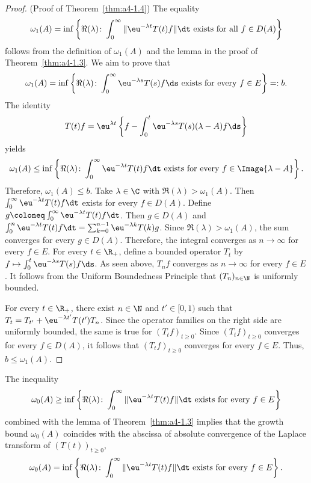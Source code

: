 \begin{proof}(Proof of Theorem~\ref{thm:a4-1.4}) 
The equality 
 \[ 
 \omega_1(A) = \inf \left\{ \Re(\lambda)\colon\int_0^\infty \|\eu^{-\lambda t} T(t) f \|  \dt \text{ exists for all } f \in D(A) \right\} 
 \] 
 follows from the definition of\/ $\omega_1(A)$ and the lemma in the proof of Theorem~\ref{thm:a4-1.3}.
We aim to prove that
\[
\omega_1(A) = \inf \left\{ \Re(\lambda)\colon\int_0^\infty \eu^{-\lambda s} T(s) f  \ds \text{ exists for every } f \in E \right\}=: b. 
\]
The identity
\[
    T(t) f = \eu^{\lambda t} \left\{ f - \int_0^{t} \eu^{-\lambda s} T(s) (\lambda - A) f  \ds \right\}
\]
yields
\[
\omega_1(A) \leq \inf \left\{ \Re(\lambda)\colon\int_0^\infty \eu^{-\lambda t} T(t) f  \dt \text{ exists for every } f \in \Image{\lambda - A} \right\}.
\]
Therefore, $\omega_1(A) \leq b$.
Take $\lambda \in \C$ with $\Re(\lambda) > \omega_1(A)$. 
Then $\int_0^\infty \eu^{-\lambda t} T(t) f  \dt$ exists for every $f \in D(A)$. 
Define $g \coloneq  \int_0^\infty \eu^{-\lambda t} T(t) f  \dt$. 
Then $g \in D(A)$ and $\int_0^n \eu^{-\lambda t} T(t) f  \dt = \sum_{k=0}^{n-1} \eu^{-\lambda k} T(k) g$. 
Since $\Re(\lambda) > \omega_1(A)$, the sum converges for every $g \in D(A)$. 
Therefore, the integral converges as $n \to \infty$ for every $f \in E$.
For every $t \in \R_+$, define a bounded operator $T_t$ by $ f \mapsto \int_0^t \eu^{-\lambda s} T(s) f  \ds$. 
As seen above, $T_n f$ converges as $n \to \infty$ for every $f \in E$. 
It follows from the Uniform Boundedness Principle that $(T_n)_{n \in \N}$ is uniformly bounded.
%


For every $t \in \R_+$, there exist $n \in \N$ and $t' \in [0,1)$ such that $T_t = T_{t'} + \eu^{-\lambda t'} T(t') T_n$. 
Since the operator families on the right side are uniformly bounded, the same is true for $(T_t f)_{t \geq 0}$. 
Since $(T_t f)_{t \geq 0}$ converges for every $f \in D(A)$, it follows that $(T_t f)_{t \geq 0}$ converges for every $f \in E$. 
Thus, $b \leq \omega_1(A)$.
\end{proof}
%


The inequality
\[
    \omega_{0}(A) \geq \inf \left\{ \Re(\lambda)\colon\int_0^\infty \|\eu^{-\lambda t} T(t) f \|  \dt 
    \text{ exists for every } f \in E \right\}
\]
combined with the lemma of Theorem~\ref{thm:a4-1.3} implies that the growth bound $\omega_{0}(A)$ coincides with the abscissa of absolute convergence of the Laplace transform of\/ $(T(t))_{t \geq 0}$, \ie
\begin{equation}\label{eq:a4-1.6}
   \omega_{0}(A) = \inf \left\{ \Re  (\lambda)\colon\int_0^\infty \|\eu^{-\lambda t} T(t) f \|  \dt \text{ exists for every } f \in E \right\}.
\end{equation}
%



